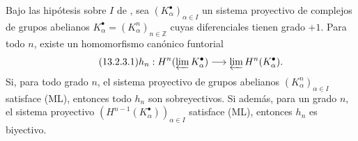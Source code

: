 \begin{proposition}[13.2.3]
\label{0.13.2.3}
\label{0.13.2.3-fr}
Bajo las hipótesis sobre $I$ de , sea
$(K_\alpha^\bullet)_{\alpha\in I}$ un sistema proyectivo
de complejos de grupos abelianos
$K_\alpha^\bullet=(K_\alpha^n)_{n\in\mathbb Z}$
cuyas diferenciales tienen grado $+1$.
Para todo $n$, existe un homomorfismo canónico funtorial
\begin{equation}
\label{0.13.2.3.1-fr}
\tag{13.2.3.1}
h_n:H^n(\varprojlim K_\alpha^\bullet)
\longrightarrow\varprojlim H^n(K_\alpha^\bullet).
\end{equation}
Si, para todo grado $n$, el sistema proyectivo de grupos abelianos
$(K_\alpha^n)_{\alpha\in I}$ satisface {\rm(ML)},
entonces todo $h_n$ son sobreyectivos. Si además, para un grado $n$, el sistema proyectivo $(H^{n-1}(K_\alpha^\bullet))_{\alpha\in I}$
satisface {\rm(ML)}, entonces $h_n$ es biyectivo.
\end{proposition}

